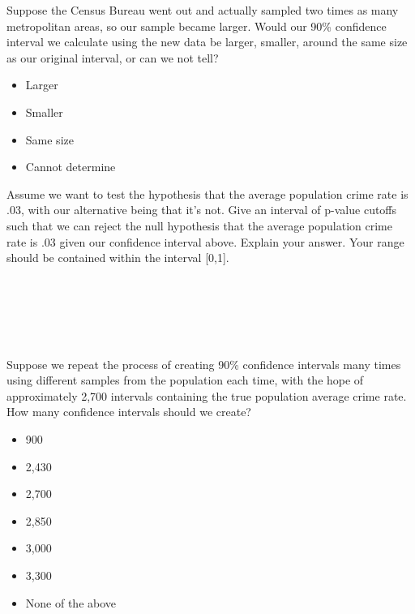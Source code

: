 \begin{enumerate}
 Suppose the Census Bureau went out and actually sampled two times as many metropolitan areas, so our sample became larger. Would our 90\% confidence interval we calculate using the new data be larger, smaller, around the same size as our original interval, or can we not tell? 
\begin{itemize}[label=\bubble]
\item Larger
\item Smaller
\item Same size
\item Cannot determine \\
\end{itemize}  

 Assume we want to test the hypothesis that the average population crime rate is .03, with our alternative being that it's not. Give an interval of p-value cutoffs such that we can reject the null hypothesis that the average population crime rate is .03 given our confidence interval above. Explain your answer. Your range should be contained within the interval [0,1]. \\ \\ \\ \\ \\ \\

 Suppose we repeat the process of creating 90\% confidence intervals many times using different samples from the population each time, with the hope of approximately 2,700 intervals containing the true population average crime rate. How many confidence intervals should we create? 
\begin{itemize}[label=\bubble]
\item 900
\item 2,430
\item 2,700
\item 2,850
\item 3,000
\item 3,300
\item None of the above
\end{itemize}  
\newpage
\end{enumerate} 